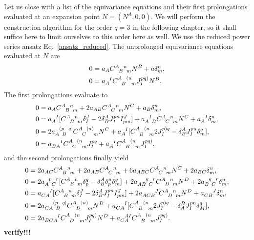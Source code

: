 Let us close with a list of the equivariance equations and their first prolongations evaluated at an expansion point $N = (N^A,0,0)$. We will perform the construction algorithm for the order $q=3$ in the following chapter, so it shall suffice here to limit ourselves to this order here as well. We use the reduced power series ansatz Eq.~\ref{ansatz_reduced}. The unprolonged equivariance equations evaluated at $N$ are
\begin{equation}
  \begin{aligned}
    0 &{} = a_A \gmc{A}{B}{n}{m} N^B + a \delta^n_m, \\
    0 &{} = a_A^{\hphantom AI}\gmc{A}{B}{(n}{m} J^{pq)}_I N^B.
  \end{aligned}
\end{equation}
The first prolongations evaluate to
\begin{equation}
  \begin{aligned}
    0 &{} = a_A \gmc{A}{B}{n}{m} + 2 a_{AB} \gmc{A}{C}{n}{m} N^C + a_B \delta^n_m, \\
    0 &{} = a_A^{\hphantom AI}\lbrack \gmc{A}{B}{n}{m} \delta^J_I - 2\delta^A_B J^{pn}_I I^J_{pm}\rbrack + a_{A\hphantom IB}^{\hphantom AI}\gmc{A}{C}{n}{m} N^C + a_A^{\hphantom AI} \delta^n_m, \\
    0 &{} = 2a_{A \hphantom pB}^{\hphantom A(p\hphantom Bq\mid} \gmc{A}{C}{\mid n)}{m} N^C + a_A^{\hphantom AI}\lbrack \gmc{A}{B}{(n}{m} 2J^{p)q}_I - \delta^A_B J^{pn}_I \delta^q_m\rbrack, \\
    0 &{} = a_{BA}^{\hphantom{BA}I} \gmc{A}{C}{(n}{m} J^{pq}_I + a_A^{\hphantom AI}\gmc{A}{B}{(n}{m} J^{pq)}_I,
  \end{aligned}
\end{equation}
and the second prolongations finally yield
\begin{equation}
  \begin{aligned}
    0 &{} = 2 a_{AC} \gmc{A}{B}{n}{m} + 2 a_{AB} \gmc{A}{C}{n}{m} + 6 a_{ABC} \gmc{A}{C}{n}{m}N^C + 2a_{BC}\delta^n_m, \\
    0 &{} = 2 a_{A\hphantom pC}^{\hphantom Ap\hphantom Cr}\lbrack \gmc{A}{B}{n}{m} \delta^q_p - \delta^A_B\delta^n_p\delta^q_m \rbrack + 2a_{AB\hphantom qC}^{\hphantom{AB}q\hphantom Cr}\gmc{A}{D}{n}{m} N^D + 2a_{B\hphantom qC}^{\hphantom Bq\hphantom Cr}\delta^n_m, \\
    0 &{} = a_{CA}^{\hphantom{CA}I} \lbrack \gmc{A}{B}{n}{m} \delta^J_I - 2 \delta^A_B J^{pn}_I I^J_{pm} \rbrack + 2 a_{ACB}^{\hphantom{ACB}J} \gmc{A}{D}{n}{m} N^D + a_{CB}^{\hphantom{CB}J} \delta^n_m, \\
    0 &{} = 2a_{CA\hphantom{p}B}^{\hphantom{CA}(p\hphantom Bq\mid}\gmc{A}{D}{\mid n)}{m}N^D + a_{CA}^{\hphantom{CA}I} \lbrack \gmc{A}{B}{(n}{m} 2 J^{p)q}_I - \delta^B_A J^{pn}_I \delta^q_M \rbrack, \\
    0 &{} = 2a_{BCA}^{\hphantom{BCA}I} \gmc{A}{D}{(n}{m}J^{pq)}_I N^D + a_{CA}^{\hphantom CAI} \gmc{A}{B}{(n}{m} J^{pq)}_I.
  \end{aligned}
\end{equation}
\textbf{verify!!!}
